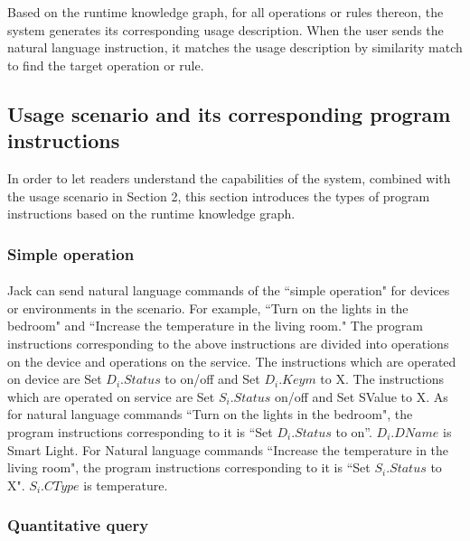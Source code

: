Based on the runtime knowledge graph, for all operations or rules thereon, the system generates its corresponding usage description. When the user sends the natural language instruction, it matches the usage description by similarity match to find the target operation or rule.

\subsection{Usage scenario and its corresponding program instructions}
In order to let readers understand the capabilities of the system, combined with the usage scenario in Section 2, this section introduces the types of program instructions based on the runtime knowledge graph.

\subsubsection{Simple operation}
\paragraph{}
Jack can send natural language commands of the ``simple operation" for devices or environments in the scenario. For example, ``Turn on the lights in the bedroom" and ``Increase the temperature in the living room." The program instructions corresponding to the above instructions are divided into operations on the device and operations on the service. The instructions which are operated on device are Set $D_{i}.Status$ to on/off and Set $D_{i}.Keym$ to X. The instructions which are operated on service are Set $S_{i}.Status$ on/off and Set SValue to X. As for natural language commands ``Turn on the lights in the bedroom", the program instructions corresponding to it is “Set $D_{i}.Status$ to on”. $D_{i}.DName$ is Smart Light. For Natural language commands ``Increase the temperature in the living room", the program instructions corresponding to it is ``Set $S_{i}.Status$ to X". $S_{i}.CType$ is temperature.

\subsubsection{Quantitative query}

